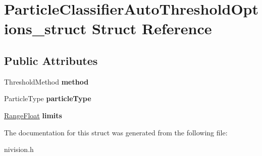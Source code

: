 \hypertarget{structParticleClassifierAutoThresholdOptions__struct}{
\section{ParticleClassifierAutoThresholdOptions\_\-struct Struct Reference}
\label{structParticleClassifierAutoThresholdOptions__struct}
}
\subsection*{Public Attributes}
\begin{DoxyCompactItemize}
\item 
\hypertarget{structParticleClassifierAutoThresholdOptions__struct_af492073a355e56fb0170b88b9341a279}{
ThresholdMethod {\bfseries method}}
\label{structParticleClassifierAutoThresholdOptions__struct_af492073a355e56fb0170b88b9341a279}

\item 
\hypertarget{structParticleClassifierAutoThresholdOptions__struct_a8658d9f6f944d59a90df96851b1a482f}{
ParticleType {\bfseries particleType}}
\label{structParticleClassifierAutoThresholdOptions__struct_a8658d9f6f944d59a90df96851b1a482f}

\item 
\hypertarget{structParticleClassifierAutoThresholdOptions__struct_a98adae4b92b0d6c909b3f4c02b44b0fc}{
\hyperlink{structRangeFloat__struct}{RangeFloat} {\bfseries limits}}
\label{structParticleClassifierAutoThresholdOptions__struct_a98adae4b92b0d6c909b3f4c02b44b0fc}

\end{DoxyCompactItemize}


The documentation for this struct was generated from the following file:\begin{DoxyCompactItemize}
\item 
nivision.h\end{DoxyCompactItemize}

